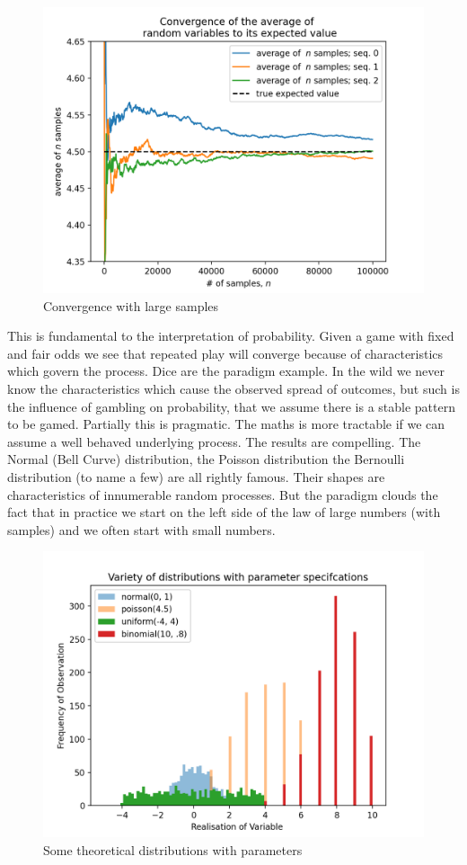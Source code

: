 \documentclass[10pt,a4paper,notitlepage, twocolumn]{article}
\begin{document}
\begin{figure}[H]
  \includegraphics[width=\linewidth]{./Plots/convergence_of_law_of_large_numbers.png}
  \caption{Convergence with large samples}
\end{figure}
\noindent  This is fundamental to the interpretation of probability. Given a game with fixed and fair odds we see that repeated play will converge because of characteristics which govern the process. Dice are the paradigm example.  In the wild we never know the characteristics which cause the observed spread of outcomes, but such is the influence of gambling on probability, that we assume there is a stable pattern to be gamed. Partially this is pragmatic. The maths is more tractable if we can assume a well behaved underlying process. The results are compelling. The Normal (Bell Curve) distribution, the Poisson distribution the Bernoulli distribution (to name a few) are all rightly famous. Their shapes are characteristics of innumerable random processes. But the paradigm clouds the fact that in practice we start on the left side of the law of large numbers (with samples) and we often start with small numbers. 
\begin{figure}[H]
  \includegraphics[width=\linewidth]{./Plots/variety_of_distributions.png}
  \caption{Some theoretical distributions with parameters}
\end{figure}
\end{document}
